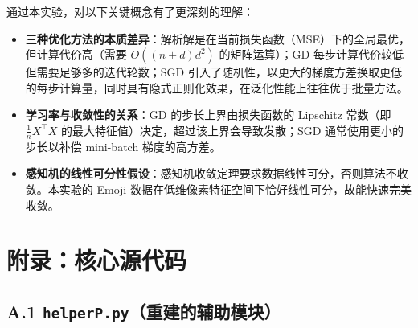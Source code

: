 \documentclass[12pt,a4paper]{ctexart}
\begin{document}
通过本实验，对以下关键概念有了更深刻的理解：

\begin{itemize}
  \item \textbf{三种优化方法的本质差异}：解析解是在当前损失函数（MSE）下的全局最优，但计算代价高（需要 $O((n+d)d^2)$ 的矩阵运算）；GD 每步计算代价较低但需要足够多的迭代轮数；SGD 引入了随机性，以更大的梯度方差换取更低的每步计算量，同时具有隐式正则化效果，在泛化性能上往往优于批量方法。
  \item \textbf{学习率与收敛性的关系}：GD 的步长上界由损失函数的 Lipschitz 常数（即 $\frac{1}{n}X^\top X$ 的最大特征值）决定，超过该上界会导致发散；SGD 通常使用更小的步长以补偿 mini-batch 梯度的高方差。
  \item \textbf{感知机的线性可分性假设}：感知机收敛定理要求数据线性可分，否则算法不收敛。本实验的 Emoji 数据在低维像素特征空间下恰好线性可分，故能快速完美收敛。
\end{itemize}

\section*{附录：核心源代码}

\subsection*{A.1 \texttt{helperP.py}（重建的辅助模块）}
\end{document}
